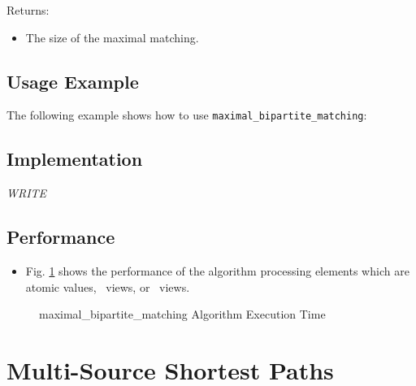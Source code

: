 Returns:
\begin{itemize}
\item
The size of the maximal matching. 
\end{itemize}

\subsection{Usage Example} \label{sec-max-bi-match-alg-use}

The following example shows how to use 
\texttt{maximal\_bipartite\_matching}:


\subsection{Implementation} \label{sec-max-bi-match-alg-impl}

\textit{WRITE}

\subsection{Performance} \label{sec-max-bi-match-alg-perf}

\begin{itemize}
\item
Fig. \ref{fig:max-bi-match-alg-exec-exper}
shows the performance of the algorithm processing
elements which are atomic values, \stl\ views, or \stapl\ views.
\end{itemize}

\begin{figure}[p]
\caption{ maximal\_bipartite\_matching Algorithm Execution Time}
\label{fig:max-bi-match-alg-exec-exper}
\end{figure}


\section{ Multi-Source Shortest Paths}
\label{sec-mssp-alg} 

